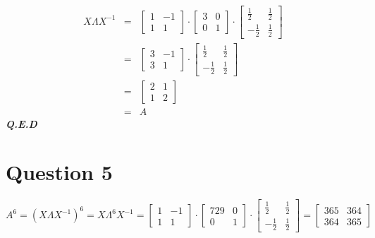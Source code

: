 \documentclass{article}
\begin{document}
\begin{eqnarray}
    X\Lambda X^{-1}
    &=&
    \begin{bmatrix}
        1 & -1\\
        1 & 1
    \end{bmatrix}
    \cdot
    \begin{bmatrix}
        3 & 0\\
        0 & 1
    \end{bmatrix}
    \cdot
    \begin{bmatrix}
        \frac{1}{2} & \frac{1}{2}\\[6pt]
        -\frac{1}{2} & \frac{1}{2}
    \end{bmatrix} \nonumber \\
    &=&
    \begin{bmatrix}
        3 & -1\\
        3 & 1
    \end{bmatrix}
    \cdot
    \begin{bmatrix}
        \frac{1}{2} & \frac{1}{2}\\[6pt]
        -\frac{1}{2} & \frac{1}{2}
    \end{bmatrix} \nonumber \\
    &=&
    \begin{bmatrix}
        2 & 1\\
        1 & 2
    \end{bmatrix} \nonumber \\
    &=&
    A \nonumber
\end{eqnarray}
\textbf{\textit{Q.E.D}}

\section{Question 5}

\[
    A^6=(X\Lambda X^{-1})^6=X\Lambda^6X^{-1}
    =
    \begin{bmatrix}
        1 & -1\\
        1 & 1
    \end{bmatrix}
    \cdot
    \begin{bmatrix}
        729 & 0\\
        0 & 1
    \end{bmatrix}
    \cdot
    \begin{bmatrix}
        \frac{1}{2} & \frac{1}{2}\\[6pt]
        -\frac{1}{2} & \frac{1}{2}
    \end{bmatrix}
    =
    \begin{bmatrix}
        365 & 364\\
        364 & 365
    \end{bmatrix}
\]
\end{document}
